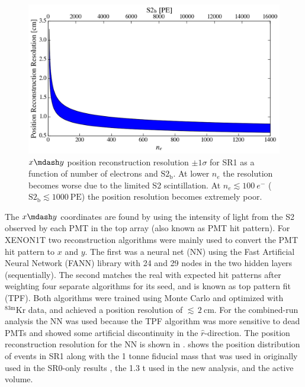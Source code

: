 \begin{figure}
\centering
\includegraphics[width=\textwidth]{PosRecRes}
\caption[$x \mdash y$ position reconstruction resolution $\pm 1\sigma$ for SR1 as a function of number of electrons and
$\mathrm{S2_b}$.]{$x \mdash y$ position reconstruction resolution $\pm 1\sigma$ for SR1 as a function of number of electrons and
$\mathrm{S2_b}$.  At lower $n_e$ the
resolution becomes worse due to the limited S2 scintillation.  At $n_e \lesssim 100\ e^-$
($\mathrm{S2_b} \lesssim 1000\ \mathrm{PE}$) the position resolution becomes extremely poor.}
\label{fig:calibrations_position_reconstruction_res}
\end{figure}

The $x \mdash y$ coordinates are found by using the intensity of light from the S2 observed by each PMT in the top array (also
known as PMT hit pattern).  For XENON1T two reconstruction algorithms were mainly used to convert the PMT hit pattern to $x$ and $y$.  The
first was a neural net (NN) using the Fast Artificial
Neural Network (FANN) library with 24 and 29 nodes in the two hidden layers (sequentially).  The second matches the real with expected hit
patterns after weighting four separate algorithms for its seed, and is known as top pattern fit (TPF).  Both algorithms were trained using
Monte Carlo and optimized with $\mathrm{^{83m}Kr}$ data, and achieved a position resolution of ${\lesssim}\, 2\ \mathrm{cm}$.  For the
combined-run analysis the NN was used because the TPF algorithm was more sensitive to dead PMTs and showed some artificial discontinuity
in the $\hat{r}$-direction.  The position reconstruction resolution for the NN is shown in
.   shows the position distribution
of events in SR1 along with
the 1 tonne fiducial mass that was used in originally used in the SR0-only results , the 1.3 t used in the new
analysis, and the active volume.

